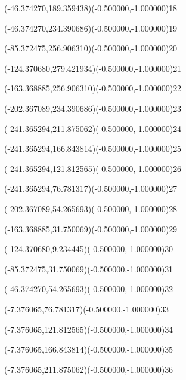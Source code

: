 \fontsize{12.000000}{14.400000}\selectfont%
\ASYalign(-46.374270,189.359438)(-0.500000,-1.000000){18}%
%
\fontsize{12.000000}{14.400000}\selectfont%
\ASYalign(-46.374270,234.390686)(-0.500000,-1.000000){19}%
%
\fontsize{12.000000}{14.400000}\selectfont%
\ASYalign(-85.372475,256.906310)(-0.500000,-1.000000){20}%
%
\fontsize{12.000000}{14.400000}\selectfont%
\ASYalign(-124.370680,279.421934)(-0.500000,-1.000000){21}%
%
\fontsize{12.000000}{14.400000}\selectfont%
\ASYalign(-163.368885,256.906310)(-0.500000,-1.000000){22}%
%
\fontsize{12.000000}{14.400000}\selectfont%
\ASYalign(-202.367089,234.390686)(-0.500000,-1.000000){23}%
%
\fontsize{12.000000}{14.400000}\selectfont%
\ASYalign(-241.365294,211.875062)(-0.500000,-1.000000){24}%
%
\fontsize{12.000000}{14.400000}\selectfont%
\ASYalign(-241.365294,166.843814)(-0.500000,-1.000000){25}%
%
\fontsize{12.000000}{14.400000}\selectfont%
\ASYalign(-241.365294,121.812565)(-0.500000,-1.000000){26}%
%
\fontsize{12.000000}{14.400000}\selectfont%
\ASYalign(-241.365294,76.781317)(-0.500000,-1.000000){27}%
%
\fontsize{12.000000}{14.400000}\selectfont%
\ASYalign(-202.367089,54.265693)(-0.500000,-1.000000){28}%
%
\fontsize{12.000000}{14.400000}\selectfont%
\ASYalign(-163.368885,31.750069)(-0.500000,-1.000000){29}%
%
\fontsize{12.000000}{14.400000}\selectfont%
\ASYalign(-124.370680,9.234445)(-0.500000,-1.000000){30}%
%
\fontsize{12.000000}{14.400000}\selectfont%
\ASYalign(-85.372475,31.750069)(-0.500000,-1.000000){31}%
%
\fontsize{12.000000}{14.400000}\selectfont%
\ASYalign(-46.374270,54.265693)(-0.500000,-1.000000){32}%
%
\fontsize{12.000000}{14.400000}\selectfont%
\ASYalign(-7.376065,76.781317)(-0.500000,-1.000000){33}%
%
\fontsize{12.000000}{14.400000}\selectfont%
\ASYalign(-7.376065,121.812565)(-0.500000,-1.000000){34}%
%
\fontsize{12.000000}{14.400000}\selectfont%
\ASYalign(-7.376065,166.843814)(-0.500000,-1.000000){35}%
%
\fontsize{12.000000}{14.400000}\selectfont%
\ASYalign(-7.376065,211.875062)(-0.500000,-1.000000){36}%

